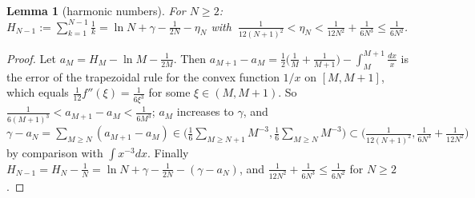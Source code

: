 \documentclass[11pt,a4paper]{article}
\theoremstyle{plain}
\newtheorem{lemma}[theorem]{Lemma}
\theoremstyle{definition}
\numberwithin{equation}{section}
\begin{document}
\begin{lemma}[harmonic numbers]\label{lem:harm}
For $N\ge2$: $H_{N-1}:=\sum_{k=1}^{N-1}\frac1k=\ln N+\gamma-\frac{1}{2N}-\eta_N$ with $\ \frac{1}{12(N+1)^2}<\eta_N<\frac1{12N^2}+\frac1{6N^3}\le\frac{1}{6N^2}$.
\end{lemma}
\begin{proof}
Let $a_M=H_M-\ln M-\frac1{2M}$. Then $a_{M+1}-a_M=\frac12\big(\frac1M+\frac1{M+1}\big)-\int_M^{M+1}\frac{dx}{x}$ is the error of the trapezoidal rule for the convex function $1/x$ on $[M,M+1]$, which equals $\frac1{12}f''(\xi)=\frac{1}{6\xi^3}$ for some $\xi\in(M,M+1)$. So $\frac{1}{6(M+1)^3}<a_{M+1}-a_M<\frac1{6M^3}$; $a_M$ increases to $\gamma$, and
$\gamma-a_N=\sum_{M\ge N}(a_{M+1}-a_M)\in\big(\frac16\sum_{M\ge N+1}M^{-3},\frac16\sum_{M\ge N}M^{-3}\big)\subset\big(\frac{1}{12(N+1)^2},\frac{1}{6N^3}+\frac{1}{12N^2}\big)$ by comparison with $\int x^{-3}dx$. Finally $H_{N-1}=H_N-\frac1N=\ln N+\gamma-\frac1{2N}-(\gamma-a_N)$, and $\frac{1}{12N^2}+\frac{1}{6N^3}\le\frac{1}{6N^2}$ for $N\ge2$.
\end{proof}
\end{document}

